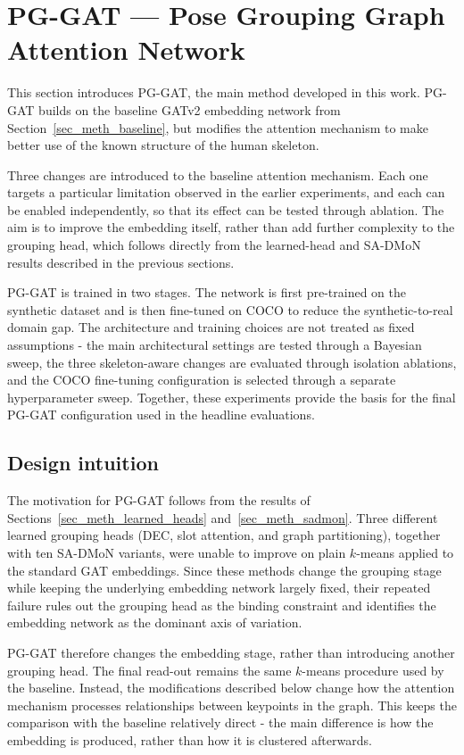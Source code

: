 \section{PG-GAT --- Pose Grouping Graph Attention Network}
\label{sec_meth_pggat}

This section introduces PG-GAT,
the main method developed in this work.
PG-GAT builds on the baseline GATv2 embedding network from
Section~\ref{sec_meth_baseline},
but modifies the attention mechanism
to make better use of the known structure of the human skeleton.

Three changes are introduced to the baseline attention mechanism.
Each one targets a particular limitation observed in the earlier
experiments,
and each can be enabled independently,
so that its effect can be tested through ablation.
The aim is to improve the embedding itself,
rather than add further complexity to the grouping head,
which follows directly from the learned-head and SA-DMoN results
described in the previous sections.

PG-GAT is trained in two stages.
The network is first pre-trained on the synthetic dataset
and is then fine-tuned on COCO
to reduce the synthetic-to-real domain gap.
The architecture and training choices are not treated
as fixed assumptions -
the main architectural settings are tested through a Bayesian sweep,
the three skeleton-aware changes are evaluated
through isolation ablations,
and the COCO fine-tuning configuration is selected
through a separate hyperparameter sweep.
Together, these experiments provide the basis
for the final PG-GAT configuration
used in the headline evaluations.

\subsection{Design intuition}
\label{sec_meth_pggat_intuition}

The motivation for PG-GAT follows from the results of
Sections~\ref{sec_meth_learned_heads} and~\ref{sec_meth_sadmon}.
Three different learned grouping heads (DEC, slot attention, and graph
partitioning),
together with ten SA-DMoN variants,
were unable to improve on plain $k$-means
applied to the standard GAT embeddings.
Since these methods change the grouping stage
while keeping the underlying embedding network largely fixed,
their repeated failure rules out the grouping head as the binding constraint
and identifies the embedding network as the dominant axis of variation.

PG-GAT therefore changes the embedding stage,
rather than introducing another grouping head.
The final read-out remains the same $k$-means procedure
used by the baseline.
Instead, the modifications described below change
how the attention mechanism processes relationships
between keypoints in the graph.
This keeps the comparison with the baseline relatively direct -
the main difference is how the embedding is produced,
rather than how it is clustered afterwards.

